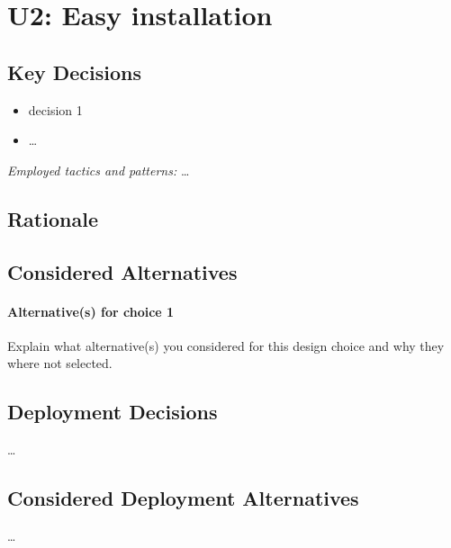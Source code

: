 \section{U2: Easy installation}
    \subsection*{Key Decisions}
    \begin{itemize}
    	\item decision 1
    	\item \ldots
    \end{itemize}
    \emph{Employed tactics and patterns:} \ldots

    \subsection*{Rationale}

    \subsection*{Considered Alternatives}
    \paragraph{Alternative(s) for choice 1} Explain what alternative(s) you
    considered for this design choice and why they where not selected.

    \subsection*{Deployment Decisions}
    \ldots

    \subsection*{Considered Deployment Alternatives}
    \ldots

